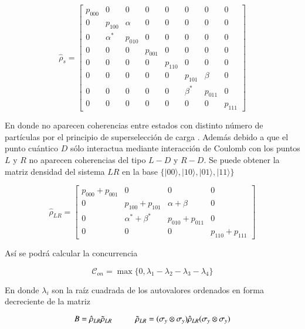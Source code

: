 \begin{appendixs}
\begin{equation*}
    \hat{\rho}_{s} = 
    \begin{bmatrix}
        p_{000} & 0 & 0 & 0 & 0 & 0 & 0 & 0 \\
        0 & p_{100} & \alpha & 0 & 0 & 0 & 0 & 0 \\
        0 & \alpha^{*} & p_{010} & 0 & 0 & 0 & 0 & 0 \\
        0 & 0 & 0 & p_{001} & 0 & 0 & 0 & 0 \\
        0 & 0 & 0 & 0 & p_{110} & 0 & 0 & 0 \\
        0 & 0 & 0 & 0 & 0 & p_{101} & \beta & 0 \\
        0 & 0 & 0 & 0 & 0 & \beta^{*} & p_{011} & 0 \\
        0 & 0 & 0 & 0 & 0 & 0 & 0 & p_{111} 
        \end{bmatrix}
\end{equation*}

En donde no aparecen coherencias entre estados con distinto número de partículas por el principio de superselección de carga \cite{bartlett2007reference,wick1997intrinsic}. Además debido a que el punto cuántico $D$ sólo interactua mediante interacción de Coulomb con los puntos $L$ y $R$ no aparecen coherencias del tipo $L-D$ y $R-D$. Se puede obtener la matriz densidad del sistema $LR$ en la base $\{|00\rangle, |10\rangle, |01\rangle, |11\rangle \}$

\begin{equation*}
    \hat{\rho}_{LR} = 
    \begin{bmatrix}
        p_{000}+p_{001} & 0 & 0 & 0  \\
        0 & p_{100} + p_{101} & \alpha + \beta & 0  \\
        0 & \alpha^{*} +\beta^{*} & p_{010} + p_{011} & 0  \\
        0 & 0 & 0 & p_{110} + p_{111} 
        \end{bmatrix}
\end{equation*}

Así se podrá calcular la concurrencia 

\begin{equation*}
    \mathcal{C}_{on} = \max \{ 0,\lambda_{1} - \lambda_{2} - \lambda_{3} - \lambda_{4} \}
\end{equation*}

En donde $\lambda_{i}$ son la raíz cuadrada de los autovalores ordenados en forma decreciente de la matriz

\begin{equation*}
    B = \hat{\rho}_{LR} \tilde{\rho}_{LR} \hspace{10mm} \tilde{\rho}_{LR} = (\sigma_{y} \otimes \sigma_{y}) \hat{\rho}_{LR} (\sigma_{y} \otimes \sigma_{y})
\end{equation*}


\end{appendixs}
